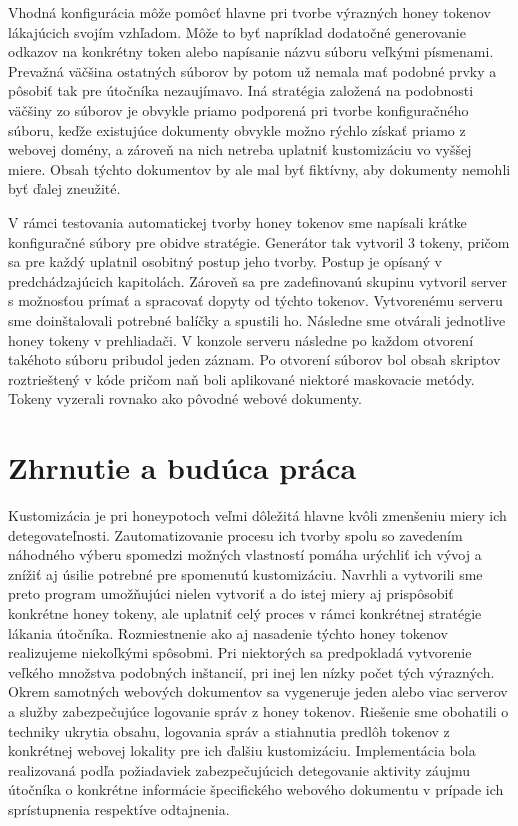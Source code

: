 \documentclass[conference, 11pt,slovak,a4paper,twoside]{IEEEtran}
\begin{document}
Vhodná konfigurácia môže pomôcť hlavne pri tvorbe výrazných honey tokenov lákajúcich svojím vzhľadom. Môže to byť napríklad dodatočné generovanie odkazov na konkrétny token alebo napísanie názvu súboru veľkými písmenami. Prevažná väčšina ostatných súborov by potom už nemala mať podobné prvky a pôsobiť tak pre útočníka nezaujímavo. Iná stratégia založená na podobnosti väčšiny zo súborov je obvykle priamo podporená pri tvorbe konfiguračného súboru, keďže existujúce dokumenty obvykle možno rýchlo získať priamo z webovej domény, a zároveň na nich netreba uplatniť kustomizáciu vo vyššej miere. Obsah týchto dokumentov by ale mal byť fiktívny, aby dokumenty nemohli byť ďalej zneužité.

V rámci testovania automatickej tvorby honey tokenov sme napísali krátke konfiguračné súbory pre obidve stratégie. Generátor tak vytvoril 3 tokeny, pričom sa pre každý uplatnil osobitný postup jeho tvorby. Postup je opísaný v predchádzajúcich kapitolách. Zároveň sa pre zadefinovanú skupinu vytvoril server s možnosťou prímať a spracovať dopyty od týchto tokenov. Vytvorenému serveru sme doinštalovali potrebné balíčky a spustili ho. Následne sme otvárali jednotlive honey tokeny v prehliadači. V konzole serveru následne po každom otvorení takéhoto súboru pribudol jeden záznam. Po otvorení súborov bol obsah skriptov roztrieštený v kóde pričom naň boli aplikované niektoré maskovacie metódy. Tokeny vyzerali rovnako ako pôvodné webové dokumenty.  



\section{Zhrnutie a budúca práca}

Kustomizácia je pri honeypotoch veľmi dôležitá hlavne kvôli zmenšeniu miery ich detegovateľnosti. Zautomatizovanie procesu ich tvorby spolu so zavedením náhodného výberu spomedzi možných vlastností pomáha urýchliť ich vývoj a znížiť aj úsilie potrebné pre spomenutú kustomizáciu. Navrhli a vytvorili sme preto program umožňujúci nielen vytvoriť a do istej miery aj prispôsobiť konkrétne honey tokeny, ale uplatniť celý proces v rámci konkrétnej stratégie lákania útočníka. Rozmiestnenie ako aj nasadenie týchto honey tokenov realizujeme niekoľkými spôsobmi. Pri niektorých sa predpokladá vytvorenie veľkého množstva podobných inštancií, pri inej len nízky počet tých výrazných. Okrem samotných webových dokumentov sa vygeneruje jeden alebo viac serverov a služby zabezpečujúce logovanie správ z honey tokenov. Riešenie sme obohatili o techniky ukrytia obsahu, logovania správ a stiahnutia predlôh tokenov z konkrétnej webovej lokality pre ich ďalšiu kustomizáciu. Implementácia bola realizovaná podľa požiadaviek zabezpečujúcich detegovanie aktivity záujmu útočníka o konkrétne informácie špecifického webového dokumentu v prípade ich sprístupnenia respektíve odtajnenia.
\end{document}
